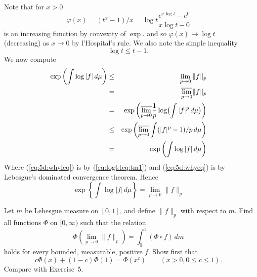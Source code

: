 \begin{enumerate}
\begin{itemize}
 Note that for \(x>0\)
 \begin{equation*}
  \varphi(x) = (t^x-1)/x
  = \log t \frac{e^{x\log t} - e^0}{x\log t - 0}
 \end{equation*}
 is an increasing function by convexity of \(\exp\).
 and so \(\varphi(x)\to \log t\) (decreasing)  as \(x\to 0\)
 by l'Hospital's rule. We also note the simple inequality
 \begin{equation} \label{eq:logt:leq:tm1}
 \log t \leq t-1.
 \end{equation}
 We now compute
 \begin{eqnarray}
  \exp\left(\int \log|f|\,d\mu\right)
  &\leq& \lim_{p\to 0} \|f\|_p          \notag \\
  &=& \overline{\lim_{p\to 0}} \|f\|_p         \notag \\
  &=& \exp\left( \overline{\lim_{p\to 0}}
                 \frac{1}{p}\log\bigl( \int |f|^p\,d\mu\bigr) \right) \notag\\
  &\leq& \exp \left(\overline{\lim_{p\to 0}}
                        \int(|f|^p-1)/p\,d\mu\right) \label{eq:5d:whyleq} \\
  &=&    \exp\left( \int \log|f|\,d\mu\right)        \label{eq:5d:whyeq}
 \end{eqnarray}
 Where (\ref{eq:5d:whyleq}) is by (\ref{eq:logt:leq:tm1})
 and   (\ref{eq:5d:whyeq})  is by Lebesgue's dominated convergence theorem.
 Hence
 \begin{equation*}
  \exp\left\{\int \log|f|\,d\mu\right\} =  \lim_{p\to 0} \|f\|_p
 \end{equation*}
\end{itemize}


\begin{excopy}
Let $m$ be Lebesgue measure on \([0,1]\), and define \(\|f\|_p\)
with respect to $m$.
Find all functions \(\Phi\) on \([0,\infty)\) such that the relation
\begin{equation*}
 \Phi(\lim_{p\to 0} \|f\|_p) = \int_0^1(\Phi\circ f)\,dm
\end{equation*}
holds for every bounded, measurable, positive $f$. Show first that
\begin{equation*}
c\Phi(x)+(1-c)\Phi(1) = \Phi(x^c) \qquad (x>0, 0\leq c\leq 1).
\end{equation*}
Compare with Exercise~5.
\end{excopy}


\end{enumerate}
